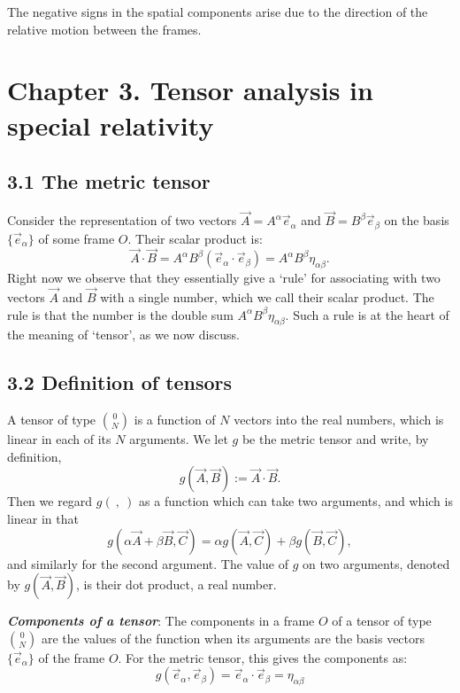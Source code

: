 \documentclass[12pt]{book}
\begin{document}
            The negative signs in the spatial components arise due to the direction of the relative motion between the frames.
           

\section{Chapter 3. Tensor analysis in special relativity}

    \subsection{3.1 The metric tensor}
        Consider the representation of two vectors $\vec{A} = A^\alpha \vec{e}_\alpha$ and $\vec{B} = B^\beta \vec{e}_\beta$ on the basis $\{ \vec{e}_\alpha \}$ of some frame $O$. Their scalar product is:
        \[
        \vec{A} \cdot \vec{B} = A^\alpha B^\beta (\vec{e}_\alpha \cdot \vec{e}_\beta) = A^\alpha B^\beta \eta_{\alpha\beta}. \tag{3.1}
        \]
        Right now we observe that they essentially give a ‘rule’ for associating with two vectors $\vec{A}$ and $\vec{B}$ with a single number, which we call their scalar product. The rule is that the number is the double sum $A^\alpha B^\beta \eta_{\alpha\beta}$. Such a rule is at the heart of the meaning of ‘tensor’, as we now discuss.

    \subsection{3.2 Definition of tensors}
        A tensor of type $\binom{0}{N}$ is a function of $N$ vectors into the real numbers, which is linear in each of its $N$ arguments.
        We let $g$ be the metric tensor and write, by definition,
        \[
        g(\vec{A}, \vec{B}) := \vec{A} \cdot \vec{B}. \tag{3.3}
        \]
        Then we regard $g(\ ,\ )$ as a function which can take two arguments, and which is linear in that
        \[
        g(\alpha \vec{A} + \beta \vec{B}, \vec{C}) = \alpha g(\vec{A}, \vec{C}) + \beta g(\vec{B}, \vec{C}), \tag{3.4}
        \]
        and similarly for the second argument. The value of $g$ on two arguments, denoted by $g(\vec{A}, \vec{B})$, is their dot product, a real number. 

        \textit{\textbf{Components of a tensor}}: The components in a frame \(O\) of a tensor of type $\binom{0}{N}$ are the values of the function when its arguments are the basis vectors \(\{ \vec{e}_\alpha \}\) of the frame \(O\). For the metric tensor, this gives the components as:
         \[
         g(\vec{e}_\alpha, \vec{e}_\beta) = \vec{e}_\alpha \cdot \vec{e}_\beta = \eta_{\alpha\beta} \tag{3.5}
         \]
\end{document}
